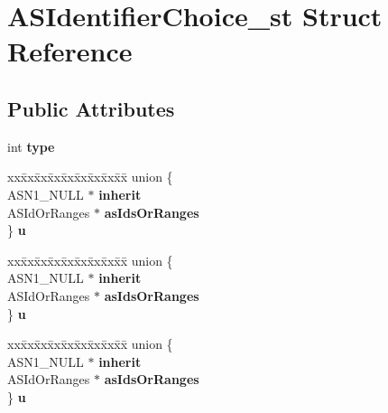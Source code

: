 \hypertarget{structASIdentifierChoice__st}{}\section{A\+S\+Identifier\+Choice\+\_\+st Struct Reference}
\label{structASIdentifierChoice__st}
\subsection*{Public Attributes}
\begin{DoxyCompactItemize}
\item 
\mbox{\label{structASIdentifierChoice__st_a370e530aebd1097c5f216cf0ae19b170}} 
int {\bfseries type}
\item 
\mbox{\label{structASIdentifierChoice__st_a1e5ba735d32b847286b0c53c337b9627}} 
\begin{tabbing}
xx\=xx\=xx\=xx\=xx\=xx\=xx\=xx\=xx\=\kill
union \{\\
\>ASN1\_NULL $\ast$ {\bfseries inherit}\\
\>ASIdOrRanges $\ast$ {\bfseries asIdsOrRanges}\\
\} {\bfseries u}\\

\end{tabbing}\item 
\mbox{\label{structASIdentifierChoice__st_afbea81678b2d840ddb5946063d1e57bc}} 
\begin{tabbing}
xx\=xx\=xx\=xx\=xx\=xx\=xx\=xx\=xx\=\kill
union \{\\
\>ASN1\_NULL $\ast$ {\bfseries inherit}\\
\>ASIdOrRanges $\ast$ {\bfseries asIdsOrRanges}\\
\} {\bfseries u}\\

\end{tabbing}\item 
\mbox{\label{structASIdentifierChoice__st_a606d0f6f586ec6cf773b911f1e9a2614}} 
\begin{tabbing}
xx\=xx\=xx\=xx\=xx\=xx\=xx\=xx\=xx\=\kill
union \{\\
\>ASN1\_NULL $\ast$ {\bfseries inherit}\\
\>ASIdOrRanges $\ast$ {\bfseries asIdsOrRanges}\\
\} {\bfseries u}\\


\end{tabbing}
\end{DoxyCompactItemize}
